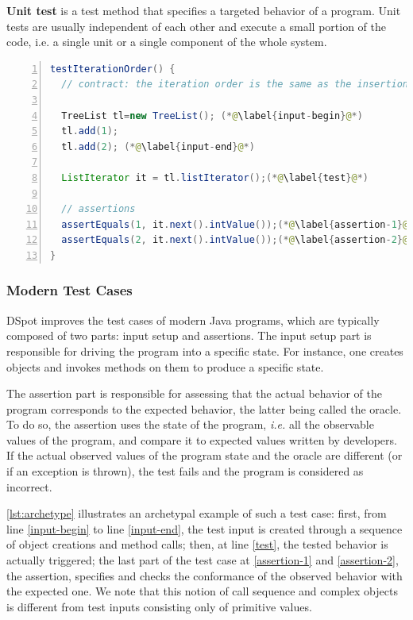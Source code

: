 \documentclass[table,xcdraw,smallextended]{svjour3}
\newcommand{\ie}{\textit{i.e.}\xspace}
\newcommand{\dspot}{DSpot\xspace}
\begin{document}
\textbf{Unit test} is a test method that specifies a targeted behavior of a program. Unit tests are usually independent of each other and execute a small portion of the code, i.e. a single unit or a single component of the whole system.


\begin{lstlisting}[caption={An example of an object-oriented test case  (inspired from Apache Commons Collections)},label=lst:archetype,float,language=java,numbers=left] 
testIterationOrder() {
  // contract: the iteration order is the same as the insertion order
  
  TreeList tl=new TreeList(); (*@\label{input-begin}@*)
  tl.add(1);
  tl.add(2); (*@\label{input-end}@*)

  ListIterator it = tl.listIterator();(*@\label{test}@*)

  // assertions
  assertEquals(1, it.next().intValue());(*@\label{assertion-1}@*)
  assertEquals(2, it.next().intValue());(*@\label{assertion-2}@*)
}
\end{lstlisting}

\subsubsection{Modern Test Cases}
\label{subsec:test-case-explanation}

\dspot improves the test cases of modern Java programs, which are typically composed of two parts: input setup and assertions. 
The input setup part is responsible for driving the program into a specific state.
For instance, one creates objects and invokes methods on them to produce a specific state.

The assertion part is responsible for assessing that the actual behavior of the program corresponds to the expected behavior, the latter being called the oracle.
To do so, the assertion uses the state of the program, \ie all the observable values of the program, and compare it to expected values written by developers.
If the actual observed values of the program state and the oracle are different (or if an exception is thrown), the test fails and the program is considered as incorrect.

\autoref{lst:archetype} illustrates an archetypal example of such a test case: 
first, from line \autoref{input-begin} to line \autoref{input-end}, the test input is created through a sequence of object creations and method calls; 
then, at line \autoref{test}, the tested behavior is actually triggered; 
the last part of the test case at \autoref{assertion-1} and \autoref{assertion-2}, the assertion, specifies and checks the conformance of the observed behavior with the expected one.
We note that this notion of call sequence and complex objects is different from test inputs consisting only of primitive values.
\end{document}
